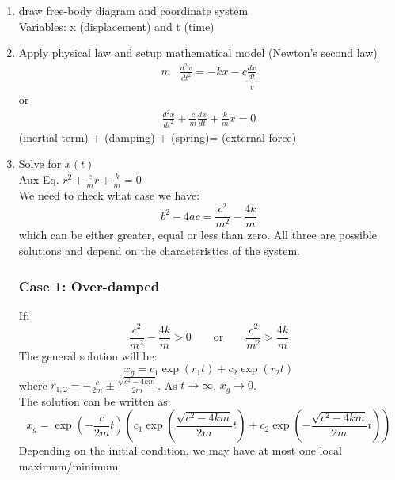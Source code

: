 \begin{enumerate}
\item draw free-body diagram and coordinate system\\
Variables: x (displacement) and t (time)
\item Apply physical law and setup mathematical model (Newton's second law)\\

\begin{align*}
m&\frac{d^2x}{dt^2} = -kx - c\underbrace{\frac{dx}{dt}}_{v}
\end{align*}
or
\begin{align*}
\boxed{\frac{d^2x}{dt^2}+\frac{c}{m}\frac{dx}{dt} +\frac{k}{m}x =0}
\end{align*}
(inertial term) + (damping) + (spring)= (external force)\\

\item Solve for $x(t)$\\
Aux Eq. $r^2+\frac{c}{m}r+\frac{k}{m}=0$\\
We need to check what case we have:
\begin{equation*}
b^2-4ac = \frac{c^2}{m^2}-\frac{4k}{m}
\end{equation*}
which can be either greater, equal or less than zero.
All three are possible solutions and depend on the characteristics of the system.
\subsubsection{Case 1: Over-damped}
If:
\begin{equation*}
\frac{c^2}{m^2}-\frac{4k}{m}>0 \qquad \text{or} \qquad \frac{c^2}{m^2}>\frac{4k}{m}
\end{equation*}
The general solution will be:
\begin{equation*}
x_g=c_1 \exp(r_1 t)+c_2 \exp(r_2 t)
\end{equation*}
where $r_{1,2}=-\frac{c}{2m}\pm\frac{\sqrt{c^2-4km}}{2m}$. As $t\rightarrow \infty$, $x_g\rightarrow 0$.\\
The solution can be written as:
\begin{equation*}
\boxed{x_g= \exp\left(-\frac{c}{2m} t\right)\left(c_1 \exp\left(\frac{\sqrt{c^2-4km}}{2m}t\right)+c_2 \exp\left(-\frac{\sqrt{c^2-4km}}{2m} t\right)\right)}
\end{equation*}
Depending on the initial condition, we may have at most one local maximum/minimum


\end{enumerate}
